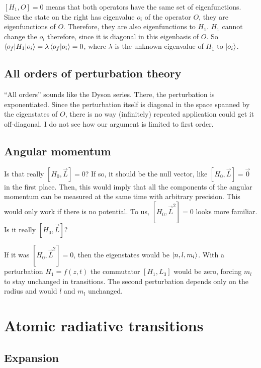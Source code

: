 \documentclass[11pt, english, fleqn, DIV=15, headinclude, BCOR=1.5cm]{scrartcl}
\begin{document}
$[H_1, O] = 0$ means that both operators have the same set of eigenfunctions.
Since the state on the right has eigenvalue $o_i$ of the operator $O$, they are
eigenfunctions of $O$. Therefore, they are also eigenfunctions to $H_1$. $H_1$
cannot change the $o_i$ therefore, since it is diagonal in this eigenbasis of
$O$. So $\braket{o_f | H_1 | o_i} = \lambda \braket{o_f | o_i} = 0$, where
$\lambda$ is the unknown eigenvalue of $H_1$ to $\ket{o_i}$.

\subsection{All orders of perturbation theory}

“All orders” sounds like the Dyson series. There, the perturbation is
exponentiated. Since the perturbation itself is diagonal in the space spanned
by the eigenstates of $O$, there is no way (infinitely) repeated application
could get it off-diagonal. I do not see how our argument is limited to first
order.

\subsection{Angular momentum}

\begin{question}
    Is that really $[H_0, \vec L] = 0$? If so, it should be the null vector,
    like $[H_0, \vec L] = \vec 0$ in the first place. Then, this would imply
    that all the components of the angular momentum can be measured at the same
    time with arbitrary precision. This would only work if there is no
    potential. To us, $[H_0, \vec L^2] = 0$ looks more familiar. Is it really
    $[H_0, \vec L]$?
\end{question}

If it was $[H_0, \vec L^2] = 0$, then the eigenstates would be $\ket{n, l,
m_l}$. With a perturbation $H_1 = f(z, t)$ the commutator $[H_1, L_3]$ would be
zero, forcing $m_l$ to stay unchanged in transitions. The second perturbation
depends only on the radius and would $l$ and $m_l$ unchanged.

\section{Atomic radiative transitions}

\subsection{Expansion}
\end{document}
